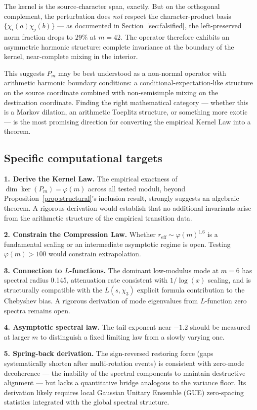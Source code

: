 \documentclass[11pt,a4paper]{article}
\begin{document}
The kernel is the source-character span, exactly. But on the orthogonal complement, the perturbation does \emph{not} respect the character-product basis $\{\chi_i(a) \overline{\chi_j(b)}\}$ --- as documented in Section~\ref{sec:falsified}, the left-preserved norm fraction drops to 29\% at $m = 42$. The operator therefore exhibits an asymmetric harmonic structure: complete invariance at the boundary of the kernel, near-complete mixing in the interior.

This suggests $P_m$ may be best understood as a non-normal operator with arithmetic harmonic boundary conditions: a conditional-expectation-like structure on the source coordinate combined with non-semisimple mixing on the destination coordinate. Finding the right mathematical category --- whether this is a Markov dilation, an arithmetic Toeplitz structure, or something more exotic --- is the most promising direction for converting the empirical Kernel Law into a theorem.

\subsection{Specific computational targets}

\textbf{1. Derive the Kernel Law.} The empirical exactness of $\dim \ker(P_m) = \varphi(m)$ across all tested moduli, beyond Proposition~\ref{prop:structural}'s inclusion result, strongly suggests an algebraic theorem. A rigorous derivation would establish that no additional invariants arise from the arithmetic structure of the empirical transition data.

\textbf{2. Constrain the Compression Law.} Whether $r_{\text{eff}} \sim \varphi(m)^{1.6}$ is a fundamental scaling or an intermediate asymptotic regime is open. Testing $\varphi(m) > 100$ would constrain extrapolation.

\textbf{3. Connection to $L$-functions.} The dominant low-modulus mode at $m = 6$ has spectral radius 0.145, attenuation rate consistent with $1/\log(x)$ scaling, and is structurally compatible with the $L(s, \chi_3)$ explicit formula contribution to the Chebyshev bias. A rigorous derivation of mode eigenvalues from $L$-function zero spectra remains open.

\textbf{4. Asymptotic spectral law.} The tail exponent near $-1.2$ should be measured at larger $m$ to distinguish a fixed limiting law from a slowly varying one.

\textbf{5. Spring-back derivation.} The sign-reversed restoring force (gaps systematically shorten after multi-rotation events) is consistent with zero-mode decoherence --- the inability of the spectral components to maintain destructive alignment --- but lacks a quantitative bridge analogous to the variance floor. Its derivation likely requires local Gaussian Unitary Ensemble (GUE) zero-spacing statistics integrated with the global spectral structure.
\end{document}

